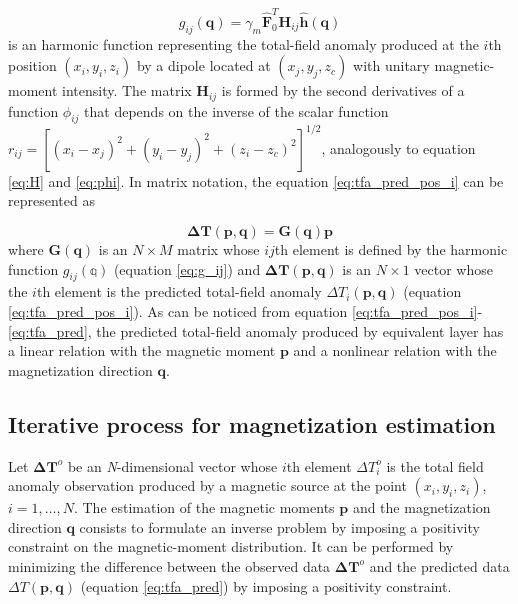 \begin{equation}
g_{ij} (\mathbf{q})  = \gamma_m \hat{\mathbf{F}}_0^T \mathbf{H}_{ij} \hat{\mathbf{h}}(\mathbf{q})
\label{eq:g_ij}
\end{equation}
is an harmonic function representing the total-field anomaly produced at the $i$th position $(x_i,y_i,z_i)$ by a dipole located at $(x_j,y_j,z_c)$ with unitary magnetic-moment intensity. The matrix $\mathbf{H}_{ij}$ is formed by the second derivatives of a function $\phi_{ij}$ that depends on the inverse of the scalar function $r_{ij} = [(x_i-x_j)^2 + (y_i-y_j)^2 + (z_i-z_c)^2]^{1/2}$, analogously to equation \ref{eq:H} and \ref{eq:phi}. In matrix notation, the equation \ref{eq:tfa_pred_pos_i} can be represented as 

\begin{equation}
 \mathbf{\Delta T} (\mathbf{p}, \mathbf{q}) = \mathbf{G}(\mathbf{q}) \mathbf{p}
\label{eq:tfa_pred}
\end{equation}
where $\mathbf{G}(\mathbf{q})$ is an $N \times M$ matrix whose $ij$th element is defined by the harmonic function $g_{ij}(\mathbb{q})$ (equation \ref{eq:g_ij}) and $\mathbf{\Delta T} (\mathbf{p}, \mathbf{q})$ is an $N \times 1$ vector whose the $i$th element is the predicted total-field anomaly $\Delta T_i (\mathbf{p},\mathbf{q})$ (equation \ref{eq:tfa_pred_pos_i}). As can be noticed from equation \ref{eq:tfa_pred_pos_i}-\ref{eq:tfa_pred}, the predicted total-field anomaly produced by equivalent layer has a linear relation with the magnetic moment $\mathbf{p}$ and a nonlinear relation with the magnetization direction $\mathbf{q}$. 

\subsection{Iterative process for magnetization estimation}


Let $\mathbf{\Delta T}^o$ be an \textit{N}-dimensional vector whose $i$th element $\Delta T_i^o$ is the total field anomaly observation produced by a magnetic source at the point $(x_i,y_i,z_i)$, $i = 1, \ldots, N$. The estimation of the magnetic moments $\mathbf{p}$ and the magnetization direction $\mathbf{q}$ consists to formulate an inverse problem by imposing a positivity constraint on the magnetic-moment distribution. It can be performed by minimizing the difference between the observed data $\mathbf{\Delta T}^o$ and the predicted data $\Delta T (\mathbf{p}, \mathbf{q})$ (equation \ref{eq:tfa_pred}) by imposing a positivity constraint. 

